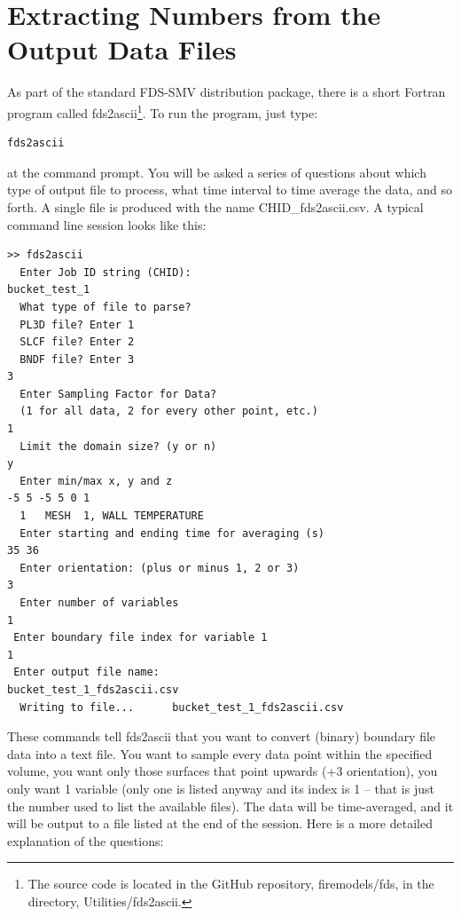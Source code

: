 \documentclass[11pt]{book}
\begin{document}
\section{Extracting Numbers from the Output Data Files}
\label{info:fds2ascii}

As part of the standard FDS-SMV distribution package, there is a short Fortran program called {\ct fds2ascii}\footnote{The source code is located in the GitHub repository, {\ct \footnotesize firemodels/fds}, in the directory, {\ct \footnotesize Utilities/fds2ascii}.}. To run the program, just type:
\begin{lstlisting}
fds2ascii
\end{lstlisting}
at the command prompt. You will be asked a series of questions about which type of output file to process, what time interval to time average the data, and so forth. A single file is produced with the name {\ct CHID\_fds2ascii.csv}. A typical command line session looks like this:
\begin{lstlisting}
>> fds2ascii
  Enter Job ID string (CHID):
bucket_test_1
  What type of file to parse?
  PL3D file? Enter 1
  SLCF file? Enter 2
  BNDF file? Enter 3
3
  Enter Sampling Factor for Data?
  (1 for all data, 2 for every other point, etc.)
1
  Limit the domain size? (y or n)
y
  Enter min/max x, y and z
-5 5 -5 5 0 1
  1   MESH  1, WALL TEMPERATURE
  Enter starting and ending time for averaging (s)
35 36
  Enter orientation: (plus or minus 1, 2 or 3)
3
  Enter number of variables
1
 Enter boundary file index for variable 1
1
 Enter output file name:
bucket_test_1_fds2ascii.csv
  Writing to file...      bucket_test_1_fds2ascii.csv
\end{lstlisting}
These commands tell {\ct fds2ascii} that you want to convert (binary) boundary file data into a text file. You want to sample every data point within the specified volume, you want only those surfaces that point upwards (+3 orientation), you only want 1 variable (only one is listed anyway and its index is 1 -- that is just the number used to list the available files). The data will be time-averaged, and it will be output to a file listed at the end of the session. Here is a more detailed explanation of the questions:
\end{document}
